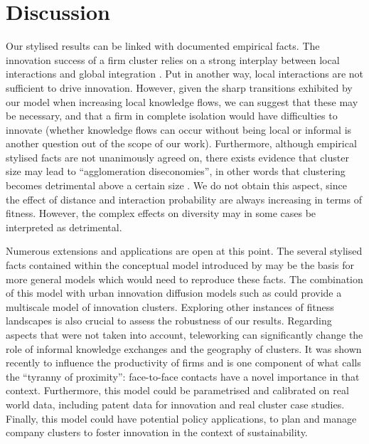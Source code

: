 \documentclass[letterpaper]{article}
\begin{document}
\section{Discussion}



Our stylised results can be linked with documented empirical facts. The innovation success of a firm cluster relies on a strong interplay between local interactions and global integration \citep{fitjar2014local}. Put in another way, local interactions are not sufficient to drive innovation. However, given the sharp transitions exhibited by our model when increasing local knowledge flows, we can suggest that these may be necessary, and that a firm in complete isolation would have difficulties to innovate (whether knowledge flows can occur without being local or informal is another question out of the scope of our work). Furthermore, although empirical stylised facts are not unanimously agreed on, there exists evidence that cluster size may lead to ``agglomeration diseconomies'', in other words that clustering becomes detrimental above a certain size \citep{folta2006geographic}. We do not obtain this aspect, since the effect of distance and interaction probability are always increasing in terms of fitness. However, the complex effects on diversity may in some cases be interpreted as detrimental.

Numerous extensions and applications are open at this point. The several stylised facts contained within the conceptual model introduced by \cite{gnyawali2013complementary} may be the basis for more general models which would need to reproduce these facts. The combination of this model with urban innovation diffusion models such as \citep{raimbault2020model} could provide a multiscale model of innovation clusters. Exploring other instances of fitness landscapes is also crucial to assess the robustness of our results. Regarding aspects that were not taken into account, teleworking can significantly change the role of informal knowledge exchanges and the geography of clusters. It was shown recently to influence the productivity of firms \citep{bergeaud4015066telework} and is one component of what \cite{duranton1999distance} calls the ``tyranny of proximity'': face-to-face contacts have a novel importance in that context. Furthermore, this model could be parametrised and calibrated on real world data, including patent data for innovation and real cluster case studies. Finally, this model could have potential policy applications, to plan and manage company clusters to foster innovation in the context of sustainability.
\end{document}
